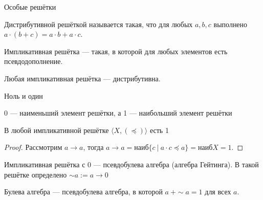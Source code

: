 \documentclass[aspectratio=169]{beamer}
\begin{document}
\begin{frame}{Особые решётки}
\begin{defrus}Дистрибутивной решёткой называется такая, что для любых $a,b,c$ выполнено
$a \cdot (b + c) = a \cdot b + a \cdot c$.
\end{defrus}

\begin{defrus}Импликативная решётка --- такая, в которой для любых элементов есть псевдодополнение.\end{defrus}

\begin{lemmarus}Любая импликативная решётка --- дистрибутивна.\end{lemmarus}
\end{frame}

\begin{frame}{Ноль и один}
\begin{defrus}0 --- наименьший элемент решётки, а 1 --- наибольший элемент решётки\end{defrus}
\begin{lemmarus}В любой импликативной решётке $\langle X, (\preceq)\rangle$ есть 1\end{lemmarus}
\begin{proof} Рассмотрим $a \rightarrow a$, тогда $a \rightarrow a = \text{наиб}\{ c \ |\ a \cdot c \preceq a\} = 
\text{наиб} X = 1$.
\end{proof}
\begin{defrus}Импликативная решётка с 0 --- псевдобулева алгебра (алгебра Гейтинга).
В такой решётке определено $\sim a := a \rightarrow 0$ \end{defrus}
\begin{defrus}Булева алгебра --- псевдобулева алгебра, в которой $a\ + \sim a = 1$ для всех $a$.\end{defrus}
\end{frame}
\end{document}
